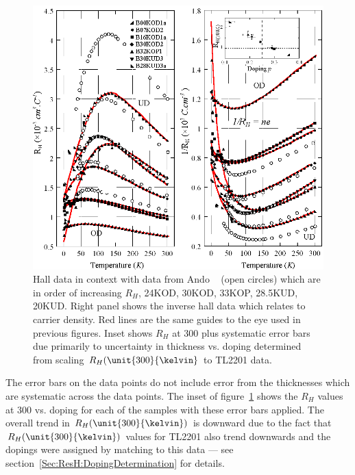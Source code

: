 \begin{figure}[htbp]
	\begin{center}
		\includegraphics[scale=1.1]{Chapter-HallBSCO/Figures/InvHallCombined/InvHallCombined}
		\caption{Hall data in context with data from Ando \etal~\cite{Ando1999} (open circles) which are in order of increasing $R_H$, 24KOD, 30KOD, 33KOP, 28.5KUD, 20KUD. Right panel shows the inverse hall data which relates to carrier density. Red lines are the same guides to the eye used in previous figures. Inset shows $R_H$ at \unit{300}{\kelvin} plus systematic error bars due primarily to uncertainty in thickness vs. doping determined from scaling $R_H(\unit{300}{\kelvin}$ to \ac{TL2201} data.}
		\label{Fig:ResH:InvHallCombined}
	\end{center}
\end{figure}

The error bars on the data points do not include error from the thicknesses which are systematic across the data points. The inset of figure~\ref{Fig:ResH:InvHallCombined} shows the $R_H$ values at \unit{300}{\kelvin} vs. doping for each of the samples with these error bars applied. The overall trend in $R_H(\unit{300}{\kelvin})$ is downward due to the fact that $R_H(\unit{300}{\kelvin})$ values for \ac{TL2201} also trend downwards and the dopings were assigned by matching to this data --- see section~\ref{Sec:ResH:DopingDetermination} for details.

